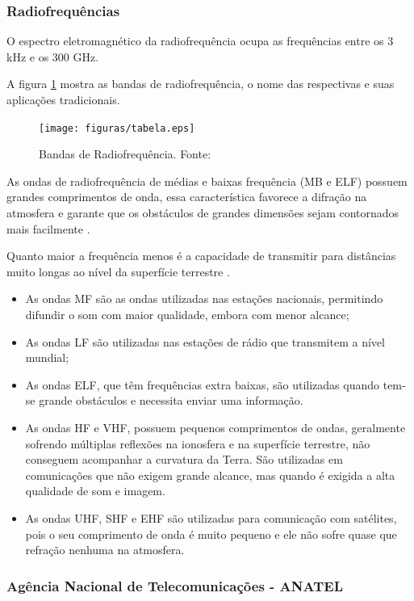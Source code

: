 \subsubsection{Radiofrequências}

O espectro eletromagnético da radiofrequência ocupa as frequências entre os 3 kHz e os 300 GHz. 

A figura \ref{fig:tabelafre} mostra as bandas de radiofrequência, o nome das respectivas e suas aplicações tradicionais.

\begin{figure}[H]
	\centering
	  \texttt{[image: figuras/tabela.eps]}
	\caption{Bandas de Radiofrequência. Fonte: \cite{tabela}}
	\label{fig:tabelafre}
\end{figure}

As ondas de radiofrequência de médias e baixas frequência (MB e ELF) possuem grandes comprimentos de onda, essa característica favorece a 
difração na atmosfera e garante que os obstáculos de grandes dimensões sejam contornados mais facilmente \cite{Rappaport2}.

Quanto maior a frequência menos é a capacidade de transmitir para distâncias muito longas ao nível da superfície terrestre \cite{VALLE1}. 

\begin{itemize}
	\item As ondas MF são as ondas utilizadas nas estações nacionais, permitindo difundir o som com maior qualidade, embora com menor alcance;
	\item As ondas LF são utilizadas nas estações de rádio que transmitem a nível mundial;
	\item As ondas ELF, que têm frequências extra baixas, são utilizadas quando tem-se grande obstáculos e necessita enviar uma informação. 
	\item As ondas HF e VHF, possuem pequenos comprimentos de ondas, geralmente sofrendo múltiplas reflexões na ionosfera e na superfície terrestre, não conseguem acompanhar a curvatura da Terra. São utilizadas em comunicações que não exigem grande alcance, mas quando é exigida a alta qualidade de som e imagem.
	\item As ondas UHF, SHF e EHF são utilizadas para comunicação com satélites, pois o seu comprimento de onda é muito pequeno e ele não sofre quase que refração nenhuma na atmosfera. 
\end{itemize} 

\subsubsection{Agência Nacional de Telecomunicações - ANATEL}

